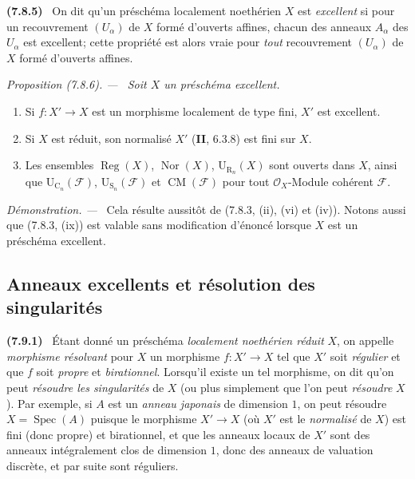 \documentclass[10pt,oneside]{book}
\makeatletter
\newcommand{\oldpage}[2][]{%
  \setcounter{footnote}{0}%
  \marginpar{\scriptsize\textbf{#1}~|~#2}\ignorespaces}
\newenvironment{env}[1][]{\par\medskip\noindent\textbf{(#1)}\ }{\par}
\newenvironment{proposition}[1][]{%
  \par\medskip\noindent\itshape Proposition (#1). ---\ }{\par}
\newenvironment{proof}{%
  \par\medskip\noindent\textit{Démonstration. ---\ }}{\par}
\newcommand{\EGAReaderTarget}[2]{\hypertarget{#1}{}\@bsphack\begingroup\def\@currentHref{#1}\label{#2}\endgroup\@esphack}
\makeatother
\begin{document}
\begin{env}[7.8.5]
\label{IV.2.s7.8.5-fr}
On dit qu'un préschéma localement noethérien $X$ est \emph{excellent} si pour
un recouvrement $(U_\alpha)$ de $X$ formé d'ouverts affines, chacun des anneaux
$A_\alpha$ des $U_\alpha$ est excellent; cette propriété est alors vraie pour
\emph{tout} recouvrement $(U_\alpha)$ de $X$ formé d'ouverts affines.
\end{env}

\begin{proposition}[7.8.6]
\EGAReaderTarget{ega4.c04.prop.7-8-6}{IV.2.s7.8.6-fr}
Soit $X$ un préschéma excellent.
\begin{enumerate}
\item[\emph{(i)}] Si $f:X'\to X$ est un morphisme localement de type fini, $X'$ est
excellent.

\oldpage[IV-2]{218}

\item[\emph{(ii)}] Si $X$ est réduit, son normalisé $X'$ (\textbf{II}, 6.3.8) est fini
sur $X$.
\item[\emph{(iii)}] Les ensembles $\operatorname{Reg}(X)$, $\operatorname{Nor}(X)$,
$\mathrm U_{\mathrm R_n}(X)$ sont ouverts dans $X$, ainsi que
$\mathrm U_{\mathrm C_n}(\mathcal F)$, $\mathrm U_{\mathrm S_n}(\mathcal F)$
et $\operatorname{CM}(\mathcal F)$ pour tout $\mathcal O_X$-Module cohérent
$\mathcal F$.
\end{enumerate}
\end{proposition}

\begin{proof}
Cela résulte aussitôt de (7.8.3, (ii), (vi) et (iv)). Notons aussi que (7.8.3,
(ix)) est valable sans modification d'énoncé lorsque $X$ est un préschéma
excellent.
\end{proof}

\subsection{Anneaux excellents et résolution des singularités}
\label{subsection:IV.2.7.9-fr}

\begin{env}[7.9.1]
\label{IV.2.s7.9.1-fr}
Étant donné un préschéma \emph{localement noethérien réduit} $X$, on appelle
\emph{morphisme résolvant} pour $X$ un morphisme $f:X'\to X$ tel que $X'$ soit
\emph{régulier} et que $f$ soit \emph{propre} et \emph{birationnel}. Lorsqu'il
existe un tel morphisme, on dit qu'on peut \emph{résoudre les singularités} de
$X$ (ou plus simplement que l'on peut \emph{résoudre} $X$). Par exemple, si
$A$ est un \emph{anneau japonais} de dimension $1$, on peut résoudre
$X=\operatorname{Spec}(A)$ puisque le morphisme $X'\to X$ (où $X'$ est le
\emph{normalisé} de $X$) est fini (donc propre) et birationnel, et que les
anneaux locaux de $X'$ sont des anneaux intégralement clos de dimension $1$,
donc des anneaux de valuation discrète, et par suite sont réguliers.
\end{env}
\end{document}
